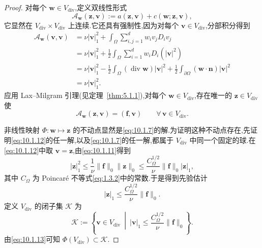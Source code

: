 \begin{proof}
对每个 \(\boldsymbol{w}\in V_{\mathrm{div}}\),定义双线性形式
\begin{equation}\label{eq:10.1.10}
  \mathcal A_{\boldsymbol{w}}(\boldsymbol{z},\boldsymbol{v})
      :=a(\boldsymbol{z},\boldsymbol{v})+c(\boldsymbol{w};\boldsymbol{z},\boldsymbol{v}),
\end{equation}
它显然在 \(V_{\mathrm{div}}\times V_{\mathrm{div}}\) 上连续.它还具有强制性,因为对每个 \(\boldsymbol{v}\in V_{\mathrm{div}}\),分部积分得到
\begin{equation}\label{eq:10.1.11}
  \begin{aligned}
    \mathcal A_{\boldsymbol{w}}(\boldsymbol{v},\boldsymbol{v})
      &=\nu|\boldsymbol{v}|_1^2+\int_\Omega\sum_{i,j=1}^d w_i v_jD_i v_j\\
      &=\nu|\boldsymbol{v}|_1^2+\frac12\int_\Omega\sum_{i=1}^d w_iD_i(|\boldsymbol{v}|^2)\\
      &=\nu|\boldsymbol{v}|_1^2-\frac12\int_\Omega
         (\operatorname{div}\boldsymbol{w})|\boldsymbol{v}|^2
          +\frac12\int_{\partial\Omega}(\boldsymbol{w}\cdot\boldsymbol{n})|\boldsymbol{v}|^2\\
      &=\nu|\boldsymbol{v}|_1^2.
  \end{aligned}
\end{equation}
应用 Lax--Milgram 引理(见定理~\ref{thm:5.1.1}),对每个 \(\boldsymbol{w}\in V_{\mathrm{div}}\),存在唯一的 \(\boldsymbol{z}\in V_{\mathrm{div}}\) 使
\begin{equation}\label{eq:10.1.12}
  \mathcal A_{\boldsymbol{w}}(\boldsymbol{z},\boldsymbol{v})=(\boldsymbol{f},\boldsymbol{v})
      \qquad\forall\,\boldsymbol{v}\in V_{\mathrm{div}}.
\end{equation}

非线性映射 \(\Phi\colon\boldsymbol{w}\mapsto\boldsymbol{z}\) 的不动点显然是\eqref{eq:10.1.7}的解.为证明这种不动点存在,先证明\eqref{eq:10.1.12}的任一解,以及\eqref{eq:10.1.7}的任一解,都属于 \(V_{\mathrm{div}}\) 中同一个固定的球.在\eqref{eq:10.1.12}中取 \(\boldsymbol{v}=\boldsymbol{z}\),由\eqref{eq:10.1.11}得到
\[
  |\boldsymbol{z}|_1^2\le\frac1\nu\|\boldsymbol{f}\|_0\|\boldsymbol{z}\|_0
         \le\frac{C_\Omega^{1/2}}{\nu}\|\boldsymbol{f}\|_0|\boldsymbol{z}|_1,
\]
其中 \(C_\Omega\) 为 Poincaré 不等式\eqref{eq:1.3.2}中的常数.于是得到先验估计
\begin{equation}\label{eq:10.1.13}
  |\boldsymbol{z}|_1\le\frac{C_\Omega^{1/2}}{\nu}\|\boldsymbol{f}\|_0.
\end{equation}
定义 \(V_{\mathrm{div}}\) 的闭子集 \(\mathcal K\) 为
\begin{equation}\label{eq:10.1.14}
  \mathcal K:=\left\{\boldsymbol{v}\in V_{\mathrm{div}}\ \middle|\
     |\boldsymbol{v}|_1\le\frac{C_\Omega^{1/2}}{\nu}\|\boldsymbol{f}\|_0\right\}.
\end{equation}
由\eqref{eq:10.1.13}可知 \(\Phi(V_{\mathrm{div}})\subset\mathcal K\).


\end{proof}
